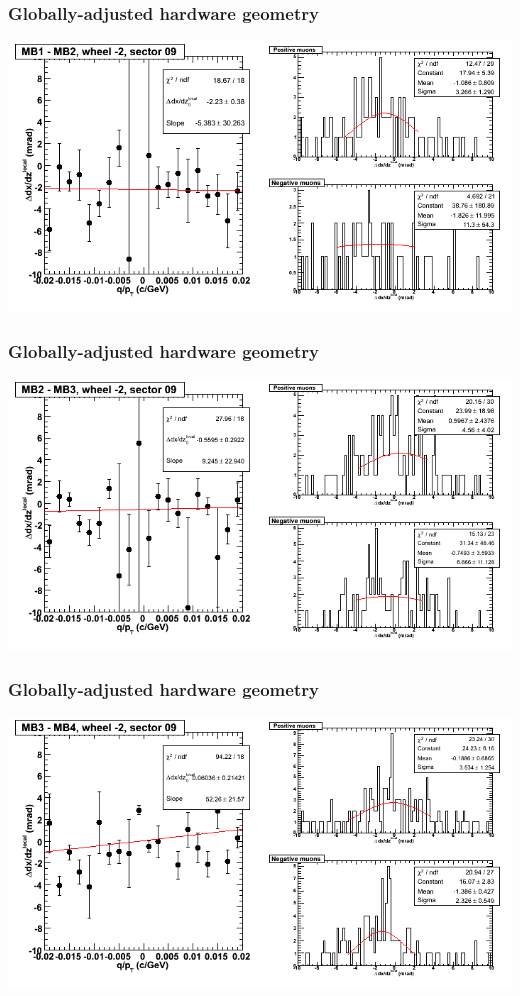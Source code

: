 \documentclass[compress]{beamer}
\begin{document}
\begin{frame}
\frametitle{Globally-adjusted hardware geometry}
\includegraphics[width=\linewidth]{NOV4_segdiffs_HW/dt13_slope_A_09_12.png}
\end{frame}

\begin{frame}
\frametitle{Globally-adjusted hardware geometry}
\includegraphics[width=\linewidth]{NOV4_segdiffs_HW/dt13_slope_A_09_23.png}
\end{frame}

\begin{frame}
\frametitle{Globally-adjusted hardware geometry}
\includegraphics[width=\linewidth]{NOV4_segdiffs_HW/dt13_slope_A_09_34.png}
\end{frame}
\end{document}
